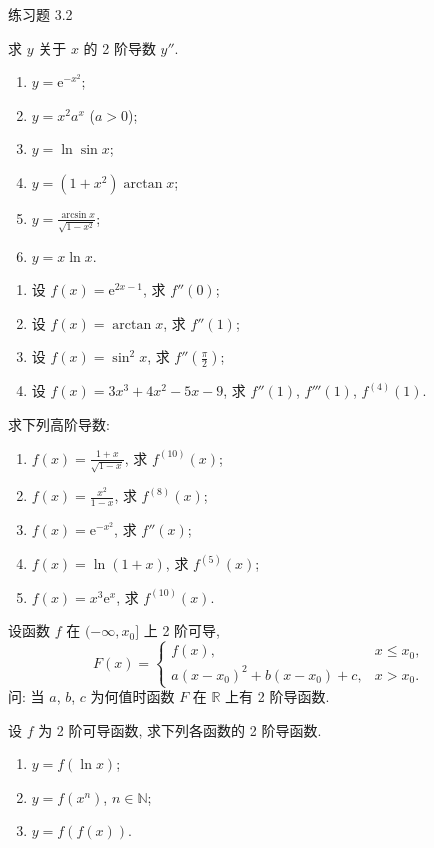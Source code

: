 \begin{exblock}{练习题 3.2}
  \item 求 $y$ 关于 $x$ 的 2 阶导数 $y''$.
  \begin{enumerate}[label=(\arabic*)]
    \item $y = \mathrm{e}^{-x^{2}}$;
    \item $y = x^{2}a^{x}$ ($a > 0$);
    \item $y = \ln\sin x$;
    \item $y = (1 + x^{2})\arctan x$;
    \item $y = \frac{\arcsin x}{\sqrt{1 - x^{2}}}$;
    \item $y = x\ln x$.
  \end{enumerate}

  \item 
  \begin{enumerate}[label=(\arabic*)]
    \item 设 $f(x) = \mathrm{e}^{2x-1}$, 求 $f''(0)$;
    \item 设 $f(x) = \arctan x$, 求 $f''(1)$;
    \item 设 $f(x) = \sin^{2}x$, 求 $f''\left(\frac{\pi}{2}\right)$;
    \item 设 $f(x) = 3x^{3} + 4x^{2} - 5x - 9$, 求 $f''(1)$, $f'''(1)$, $f^{(4)}(1)$.
  \end{enumerate}

  \item 求下列高阶导数:
  \begin{enumerate}[label=(\arabic*)]
    \item $f(x) = \frac{1+x}{\sqrt{1-x}}$, 求 $f^{(10)}(x)$;
    \item $f(x) = \frac{x^{2}}{1-x}$, 求 $f^{(8)}(x)$;
    \item $f(x) = \mathrm{e}^{-x^{2}}$, 求 $f''(x)$;
    \item $f(x) = \ln(1+x)$, 求 $f^{(5)}(x)$;
    \item $f(x) = x^{3}\mathrm{e}^{x}$, 求 $f^{(10)}(x)$.
  \end{enumerate}

  \item 设函数 $f$ 在 $(-\infty, x_0]$ 上 2 阶可导,
  \[
  F(x) = \begin{cases}f(x), & x \leqslant x_0,\\ a(x-x_0)^{2} + b(x-x_0) + c, & x > x_0.\end{cases}
\]
  问: 当 $a$, $b$, $c$ 为何值时函数 $F$ 在 $\mathbb{R}$ 上有 2 阶导函数.

  \item 设 $f$ 为 2 阶可导函数, 求下列各函数的 2 阶导函数.
  \begin{enumerate}[label=(\arabic*)]
    \item $y = f(\ln x)$;
    \item $y = f(x^{n})$, $n \in \mathbb{N}$;
    \item $y = f(f(x))$.
  \end{enumerate}


\end{exblock}
